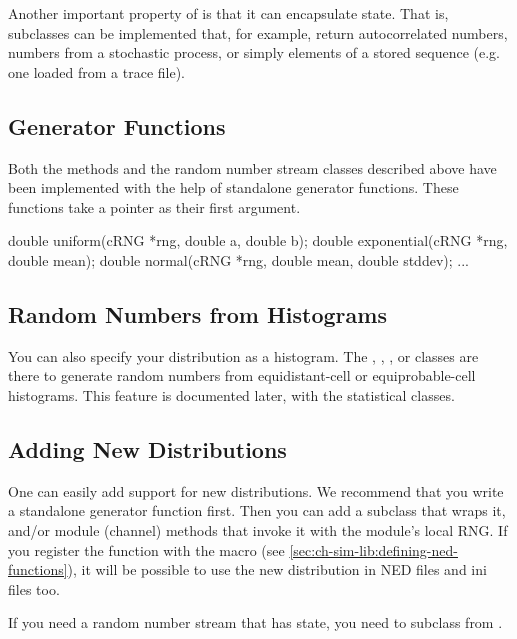 Another important property of  is that it can encapsulate
state. That is, subclasses can be implemented that, for example, return
autocorrelated numbers, numbers from a stochastic process, or simply
elements of a stored sequence (e.g. one loaded from a trace file).

\subsection{Generator Functions}

Both the  methods and the random number stream classes
described above have been implemented with the help of standalone generator
functions. These functions take a  pointer as their first
argument.

\begin{cpp}
double uniform(cRNG *rng, double a, double b);
double exponential(cRNG *rng, double mean);
double normal(cRNG *rng, double mean, double stddev);
...
\end{cpp}

\subsection{Random Numbers from Histograms}

You can also specify your distribution as a
histogram. The
, ,
,  or  classes
are there to generate random numbers from equi\-dis\-tant-cell or
equiprobable-cell histograms.  This feature is documented later, with
the statistical classes.

\subsection{Adding New Distributions}

One can easily add support for new distributions. We recommend that
you write a standalone generator function first. Then you can add
a  subclass that wraps it, and/or module (channel)
methods that invoke it with the module's local RNG.
If you register the function with the 
macro (see \ref{sec:ch-sim-lib:defining-ned-functions}), it will be
possible to use the new distribution in NED files and ini files too.

If you need a random number stream that has state, you need to
subclass from .


